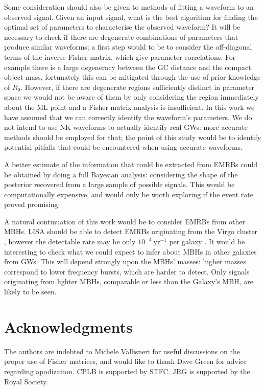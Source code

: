 \documentclass[useAMS,usedcolumn,usegraphicx,usenatbib]{mn2e}
\newcommand{\units}[1]{\ensuremath{~\mathrm{#1}}}
\begin{document}
Some consideration should also be given to methods of fitting a waveform to an observed signal. Given an input signal, what is the best algorithm for finding the optimal set of parameters to characterise the observed waveform? It will be necessary to check if there are degenerate combinations of parameters that produce similar waveforms; a first step would to be to consider the off-diagonal terms of the inverse Fisher matrix, which give parameter correlations. For example there is a large degeneracy between the GC distance and the compact object mass, fortunately this can be mitigated through the use of prior knowledge of $R_0$. However, if there are degenerate regions sufficiently distinct in parameter space we would not be aware of them by only considering the region immediately about the ML point and a Fisher matrix analysis is insufficient. In this work we have assumed that we can correctly identify the waveform's parameters. We do not intend to use NK waveforms to actually identify real GWs: more accurate methods should be employed for that; the point of this study would be to identify potential pitfalls that could be encountered when using accurate waveforms.

A better estimate of the information that could be extracted from EMRBs could be obtained by doing a full Bayesian analysis: considering the shape of the posterior recovered from a large sample of possible signals. This would be computationally expensive, and would only be worth exploring if the event rate proved promising.

A natural continuation of this work would be to consider EMRBs from other MBHs. LISA should be able to detect EMRBs originating from the Virgo cluster \citep{Rubbo2006}, however the detectable rate may be only $10^{-4}\units{yr^{-1}}$ per galaxy \citep{Hopman2007}. It would be interesting to check what we could expect to infer about MBHs in other galaxies from GWs. This will depend strongly upon the MBHs' masses: higher masses correspond to lower frequency bursts, which are harder to detect. Only signals originating from lighter MBHs, comparable or less than the Galaxy's MBH, are likely to be seen.

\section*{Acknowledgments}

The authors are indebted to Michele Vallisneri for useful discussions on the proper use of Fisher matrices, and would like to thank Dave Green for advice regarding apodization. CPLB is supported by STFC. JRG is supported by the Royal Society.
\end{document}
